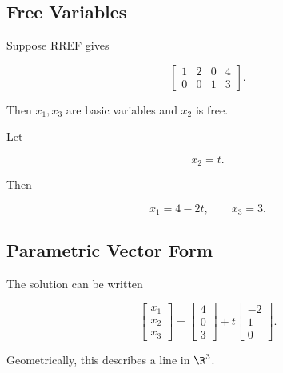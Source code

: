 \subsection{Free Variables}
\label{subsec:free-variables}

Suppose RREF gives

\[ \left[\begin{array}{ccc|c}
1&2&0&4\\
0&0&1&3
\end{array}\right]. \]

Then \(x_1,x_3\) are basic variables and \(x_2\) is free.

Let

\[ x_2=t. \]

Then

\[ x_1=4-2t,\qquad x_3=3. \]

\subsection{Parametric Vector Form}
\label{subsec:parametric-vector-form}

The solution can be written

\[ \begin{bmatrix}x_1\\x_2\\x_3\end{bmatrix}
=
\begin{bmatrix}4\\0\\3\end{bmatrix}
+t
\begin{bmatrix}-2\\1\\0\end{bmatrix}. \]

Geometrically, this describes a line in \(\R^3\).

\begin{center}
\end{center}

